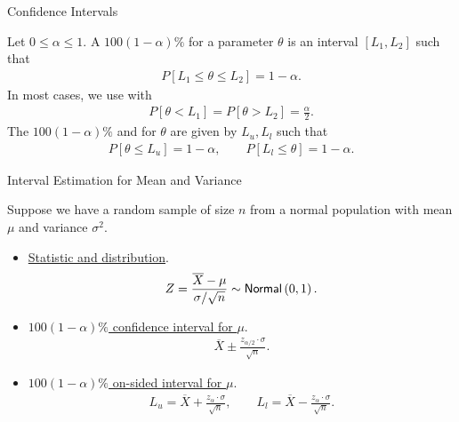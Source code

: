 \begin{frame}{Confidence Intervals}

\justifying
{} Let $0\leq \alpha \leq 1$. A $100(1-\alpha)\%$  for a parameter $\theta$ is an interval $[L_1, L_2]$ such that
\begin{align*}
P[L_1\leq \theta\leq L_2] = 1 - \alpha.
\end{align*}
In most cases, we use  with
\begin{align*}
P[\theta < L_1] = P[\theta > L_2] = \frac{\alpha}{2}.
\end{align*}
The $100(1-\alpha)\%$  and  for $\theta$ are given by $L_u, L_l$ such that
\begin{align*}
P[\theta \leq L_u] = 1 - \alpha, \qquad P[L_l \leq \theta] = 1 - \alpha.
\end{align*}

\end{frame}


\begin{frame}{Interval Estimation for Mean and Variance}

\justifying
Suppose we have a random sample of size $n$ from a normal population with  mean $\mu$ and  variance $\sigma^2$.
\begin{itemize}
	\item \underline{Statistic and distribution}.
	\begin{align*}
	Z = \frac{\overline{X} - \mu}{\sigma / \sqrt{n}} \sim \mathsf{Normal}\left(0, 1 \right).
	\end{align*}
	\item \underline{$100(1-\alpha)\%$ confidence interval for $\mu$}.
	\begin{align*}
	\overline{X} \pm \frac{z_{\alpha/2}\cdot\sigma}{\sqrt{n}}.
	\end{align*}
	\item \underline{$100(1-\alpha)\%$ on-sided interval for $\mu$}.
	\begin{align*}
	L_u = \overline{X} + \frac{z_{\alpha}\cdot\sigma}{\sqrt{n}}, \qquad L_l = \overline{X} - \frac{z_{\alpha}\cdot \sigma}{\sqrt{n}}.
	\end{align*}
\end{itemize}

\end{frame}


